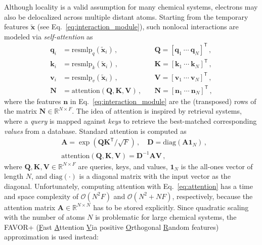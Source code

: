 \documentclass[%
superscriptaddress,
reprint,
nofootinbib,
amsmath,amssymb,amsfonts,
floatfix,
altaffilletter,
showkeys,
]{revtex4-2}
\begin{document}
Although locality is a valid assumption for many chemical systems,\cite{unke2020machine} electrons may also be delocalized across multiple distant atoms. Starting from the temporary features $\mathbf{\tilde{x}}$ (see Eq.~\ref{eq:interaction_module}), such nonlocal interactions are modeled via \emph{self-attention}\cite{vaswani2017attention} as
\begin{equation}
\begin{aligned}
\mathbf{q}_i &= \mathrm{resmlp}_q(\tilde{\mathbf{x}}_i)\,, &\mathbf{Q} = \left[\mathbf{q}_1 \ \cdots \ \mathbf{q}_N\right]^\mathsf{T}\,, \\
\mathbf{k}_i &= \mathrm{resmlp}_k(\tilde{\mathbf{x}}_i)\,, &\mathbf{K} = \left[\mathbf{k}_1 \ \cdots \ \mathbf{k}_N\right]^\mathsf{T}\,, \\
\mathbf{v}_i &= \mathrm{resmlp}_v(\tilde{\mathbf{x}}_i)\,, &\mathbf{V} = \left[\mathbf{v}_1 \ \cdots \ \mathbf{v}_N\right]^\mathsf{T}\,, \\
\mathbf{N} &= \mathrm{attention}(\mathbf{Q}, \mathbf{K}, \mathbf{V})\,, \quad  &\mathbf{N} = \left[\mathbf{n}_1 \ \cdots \ \mathbf{n}_N\right]^\mathsf{T}\,,
\end{aligned}
\label{eq:nonlocal_interaction}
\end{equation}
where the features $\mathbf{n}$ in Eq.~\ref{eq:interaction_module} are the (transposed) rows of the matrix $\mathbf{N}\in\mathbb{R}^{N\times F}$. The idea of attention is inspired by retrieval systems,\cite{kowalski2007information} where a \emph{query} is mapped against \emph{keys} to retrieve the best-matched corresponding \emph{values} from a database. Standard attention is computed as
\begin{equation}
\begin{aligned}
&\mathbf{A} = \exp\left({\mathbf{Q}\mathbf{K}^{\mathsf{T}}/\sqrt{F}}\right)\,,\quad \mathbf{D}=\mathrm{diag}(\mathbf{A}\mathbf{1}_N)\,,\\
&\mathrm{attention}(\mathbf{Q},\mathbf{K}, \mathbf{V}) = \mathbf{D}^{-1}\mathbf{A}\mathbf{V}\,,
\end{aligned}
\label{eq:attention}
\end{equation}
where $\mathbf{Q},\mathbf{K},\mathbf{V}\in \mathbb{R}^{N\times F}$ are queries, keys, and values, $\mathbf{1}_N$ is the all-ones vector of length $N$, and $\mathrm{diag}(\cdot)$ is a diagonal matrix with the input vector as the diagonal. Unfortunately, computing attention with Eq.~\ref{eq:attention} has a time and space complexity of $\mathcal{O}(N^2F)$ and $\mathcal{O}(N^2+NF)$,\cite{choromanski2020rethinking} respectively, because the attention matrix $\mathbf{A}\in\mathbb{R}^{N\times N}$ has to be stored explicitly. Since quadratic scaling with the number of atoms $N$ is problematic for large chemical systems, the FAVOR+ (\underline{F}ast \underline{A}ttention \underline{V}ia positive \underline{O}rthogonal \underline{R}andom features) approximation\cite{choromanski2020rethinking} is used instead:
\end{document}
